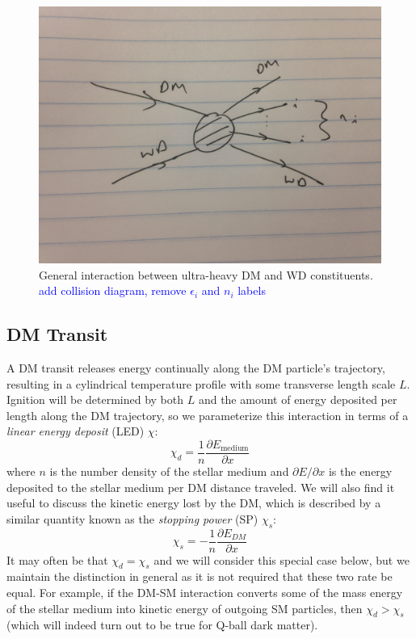\documentclass[twocolumn,showpacs,preprintnumbers,amsmath,amssymb,prd]{revtex4}
\begin{document}
\begin{figure}
\includegraphics[scale=.05]{feynmandiag}
\caption{General interaction between ultra-heavy DM and WD constituents. \textcolor{blue}{add collision diagram, remove $\epsilon_i$ and $n_i$ labels}}
\end{figure}

\subsection{DM Transit}

A DM transit releases energy continually along the DM particle's trajectory, resulting in a cylindrical temperature profile with some transverse length scale $L$.  Ignition will be determined by both $L$ and the amount of energy deposited per length along the DM trajectory, so we parameterize this interaction in terms of a \emph{linear energy deposit} (LED) $\chi{}$:
\[
    \chi_{d} = 
    \frac{1}{n} \frac{\partial{E_{\text{medium}}}}{\partial{x}}
\]
where $n$ is the number density of the stellar medium and $\partial{E}/\partial{x}$ is the energy deposited to the stellar medium per DM distance traveled.  We will also find it useful to discuss the kinetic energy lost by the DM, which is described by a similar quantity known as the \emph{stopping power} (SP) $\chi_s$:
\[
    \chi_{s} = 
    - \frac{1}{n} \frac{\partial{E_{DM}}}{\partial{x}}
\]
It may often be that $\chi_d = \chi_s$ and we will consider this special case below, but we maintain the distinction in general as it is not required that these two rate be equal.  For example, if the DM-SM interaction converts some of the mass energy of the stellar medium into kinetic energy of outgoing SM particles, then $\chi_d > \chi_s$ (which will indeed turn out to be true for Q-ball dark matter). 
\end{document}
